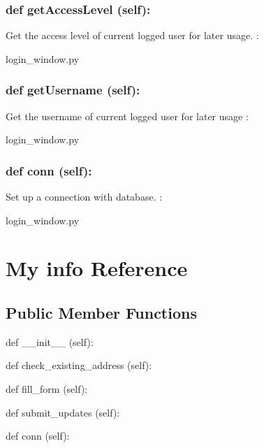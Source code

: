\hypertarget{class_poly_a14a7ad77ce612b0c54f531d307ee4b39}{
\subsubsection[{def getAccessLevel (self):}]{\setlength{\rightskip}{0pt plus 5cm}def {getAccessLevel} (self):}}\label{class_poly_a14a7ad77ce612b0c54f531d307ee4b39}
Get the access level of current logged user for later usage.
:\begin{DoxyCompactItemize}
\item 
login\_window.\-py\end{DoxyCompactItemize}

\hypertarget{class_poly_a14a7ad77ce612b0c54f531d307ee4b39}{
\subsubsection[{def getUsername (self):}]{\setlength{\rightskip}{0pt plus 5cm}def {getUsername} (self):}}\label{class_poly_a14a7ad77ce612b0c54f531d307ee4b39}
Get the username of current logged user for later usage  
:\begin{DoxyCompactItemize}
\item 
login\_window.\-py\end{DoxyCompactItemize}

\hypertarget{class_poly_a14a7ad77ce612b0c54f531d307ee4b39}{
\subsubsection[{def conn (self):}]{\setlength{\rightskip}{0pt plus 5cm}def {conn} (self):}}\label{class_poly_a14a7ad77ce612b0c54f531d307ee4b39}
Set up a connection with database.
:\begin{DoxyCompactItemize}
\item 
login\_window.\-py\end{DoxyCompactItemize}


\hypertarget{My_info}{\section{My info Reference}
\label{My_info}
}
\subsection*{Public Member Functions}
\begin{DoxyCompactItemize}
\item 
def {\_\_init\_\_} (self):
\item 
def {check\_existing\_address} (self):
\item 
def {fill\_form} (self):
\item 
def {submit\_updates} (self):
\item 
def {conn} (self):
\end{DoxyCompactItemize}

